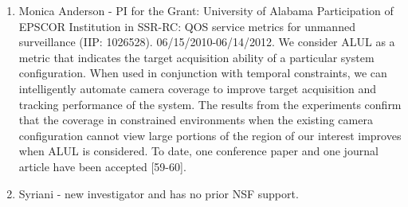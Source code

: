 \begin{enumerate}
\item Monica Anderson  - PI for the Grant: University of Alabama Participation of EPSCOR Institution in SSR-RC: QOS service metrics for unmanned surveillance (IIP: 1026528).  06/15/2010-06/14/2012. We consider ALUL as a metric that indicates the target acquisition ability of a particular system configuration. When used in conjunction with temporal constraints, we can intelligently automate camera coverage to improve target acquisition and tracking performance of the system. The results from the experiments confirm that the coverage in constrained environments when the existing camera configuration cannot view large portions of the region of our interest improves when ALUL is considered.  To date, one conference paper and one journal article have been accepted [59-60].
\item Syriani - new investigator and has no prior NSF support.

\end{enumerate}
